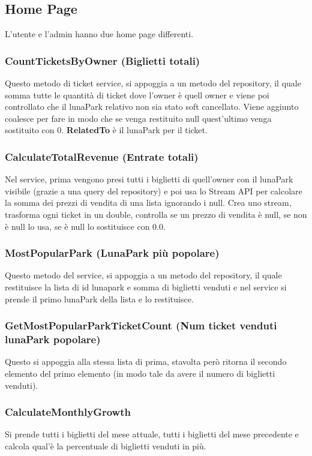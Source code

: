\documentclass{article}
\numberwithin{equation}{subsection}
\begin{document}
\subsection{Home Page}
L'utente e l'admin hanno due home page differenti.
\subsubsection{CountTicketsByOwner (Biglietti totali)}
Questo metodo di ticket service, si appoggia a un metodo del repository, il quale somma tutte le quantità di ticket dove l'owner è quell owner e viene poi controllato che il lunaPark relativo non sia stato soft cancellato. Viene aggiunto coalesce per fare in modo che se venga restituito null quest'ultimo venga sostituito con 0. \textbf{RelatedTo} è il lunaPark per il ticket.
\subsubsection{CalculateTotalRevenue (Entrate totali)}
Nel service, prima vengono presi tutti i biglietti di quell'owner con il lunaPark visibile (grazie a una query del repository) e poi usa lo Stream API per calcolare la somma dei prezzi di vendita di una lista ignorando i null. Crea uno stream, trasforma ogni ticket in un double, controlla se un prezzo di vendita è null, se non è null lo usa, se è null lo sostituisce con 0.0.
\subsubsection{MostPopularPark (LunaPark più popolare)}
Questo metodo del service, si appoggia a un metodo del repository, il quale restituisce la lista di id lunapark e somma di biglietti venduti e nel service si prende il primo lunaPark della lista e lo restituisce.
\subsubsection{GetMostPopularParkTicketCount (Num ticket venduti lunaPark popolare)}
Questo si appoggia alla stessa lista di prima, stavolta però ritorna il secondo elemento del primo elemento (in modo tale da avere il numero di biglietti venduti).
\subsubsection{CalculateMonthlyGrowth}
Si prende tutti i biglietti del mese attuale, tutti i biglietti del mese precedente e calcola qual'è la percentuale di biglietti venduti in più.
\end{document}
